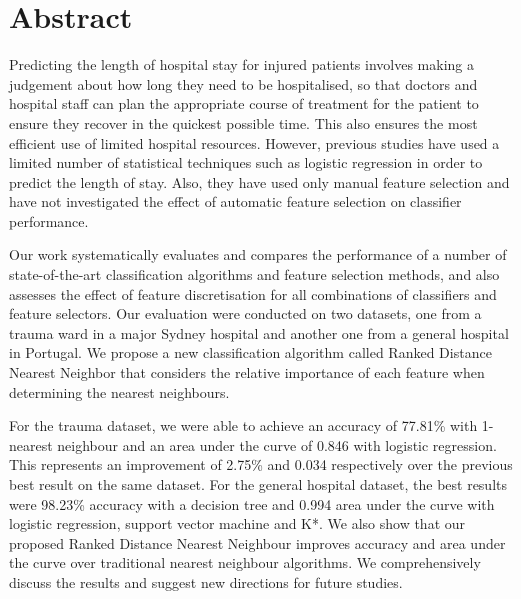 \chapter*{Abstract}

Predicting the length of hospital stay for injured patients involves making a
judgement about how long they need to be hospitalised, so that doctors and
hospital staff can plan the appropriate course of treatment for the patient
to ensure they recover in the quickest possible time. This also ensures the
most efficient use of limited hospital resources. However, previous studies
have used a limited number of statistical techniques such as logistic
regression in order to predict the length of stay. Also, they have used only
manual feature selection and have not investigated the effect of automatic
feature selection on classifier performance.

Our work systematically evaluates and compares the performance of a number of
state-of-the-art classification algorithms  and feature selection methods,
and also assesses the effect of feature discretisation for all combinations
of classifiers and feature selectors.  Our evaluation were conducted on two
datasets, one from a trauma ward in a major Sydney hospital and another one
from a general hospital in Portugal. We propose a new classification algorithm
called Ranked Distance Nearest Neighbor that considers the
relative importance of each feature when determining the nearest neighbours.

For the trauma dataset, we were able to achieve an accuracy of 77.81\% with
1-nearest neighbour and an area under the curve of 0.846 with logistic
regression. This represents an improvement of 2.75\% and 0.034 respectively
over the previous best result on the same dataset. For the
general hospital dataset, the best results were 98.23\% accuracy with a
decision tree and 0.994 area under the curve with logistic regression,
support vector machine and K*. We also show that our proposed Ranked
Distance Nearest Neighbour improves accuracy and area under the curve over
traditional nearest neighbour algorithms. We comprehensively discuss
the results and suggest new directions for future studies.
